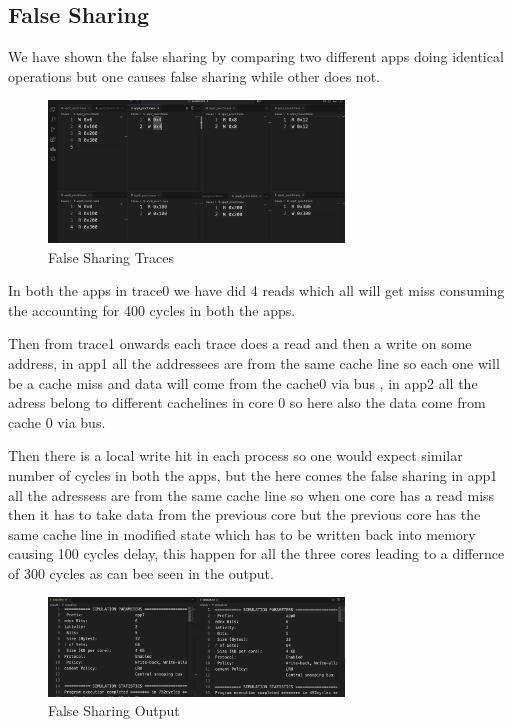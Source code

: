 \documentclass{article}
\begin{document}
\subsection{False Sharing}
We have shown the false sharing by comparing two different apps doing identical operations but one causes false sharing while other does not.
\begin{figure}[H]
        \centering
        \includegraphics[width=0.7\textwidth]{false.png}
        \caption{False Sharing Traces}
        \label{fig:fixed_size_variation}
    \end{figure}
In both the apps in trace0 we have did 4 reads which all will get miss consuming the accounting for 400 cycles in both the apps.

Then from trace1 onwards each trace does a read and then a write on some address, in app1 all the addressees are from the same cache line so each one will be a cache miss and data will come from the cache0 via bus , in app2 all the adress belong to different cachelines in core 0 so here also the data come from cache 0 via bus.

Then there is a local write hit in each process so one would expect similar number of cycles in both the apps, but the here comes the false sharing in app1 all the adressess are from the same cache line so when one core has a read miss then it has to take data from the previous core but  the previous core has the same cache line in modified state which has to be written back into memory causing 100 cycles delay, this happen for all the three cores leading to a differnce of 300 cycles as can bee seen in the output.

 \begin{figure}[H]
        \centering
        \includegraphics[width=0.7\textwidth]{false_output.png}
        \caption{False Sharing Output}
        \label{fig:fixed_size_variation}
    \end{figure}
\end{document}
